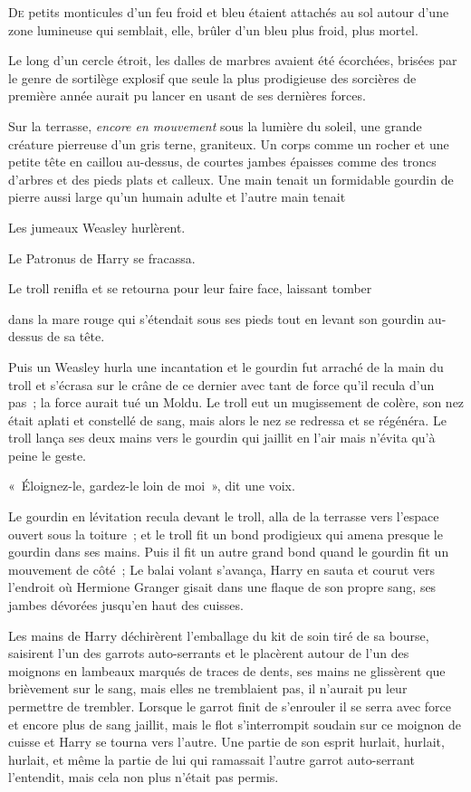
\lettrine{D}{e} petits monticules d'un feu froid et bleu étaient attachés au sol autour d'une zone lumineuse qui semblait, elle, brûler d'un bleu plus froid, plus mortel.

Le long d'un cercle étroit, les dalles de marbres avaient été écorchées, brisées par le genre de sortilège explosif que seule la plus prodigieuse des sorcières de première année aurait pu lancer en usant de ses dernières forces.

Sur la terrasse, \emph{encore en mouvement} sous la lumière du soleil, une grande créature pierreuse d'un gris terne, graniteux. Un corps comme un rocher et une petite tête en caillou au-dessus, de courtes jambes épaisses comme des troncs d'arbres et des pieds plats et calleux. Une main tenait un formidable gourdin de pierre aussi large qu'un humain adulte et l'autre main tenait

Les jumeaux Weasley hurlèrent.

Le Patronus de Harry se fracassa.

Le troll renifla et se retourna pour leur faire face, laissant tomber

dans la mare rouge qui s'étendait sous ses pieds tout en levant son gourdin au-dessus de sa tête.

Puis un Weasley hurla une incantation et le gourdin fut arraché de la main du troll et s'écrasa sur le crâne de ce dernier avec tant de force qu'il recula d'un pas~; la force aurait tué un Moldu. Le troll eut un mugissement de colère, son nez était aplati et constellé de sang, mais alors le nez se redressa et se régénéra. Le troll lança ses deux mains vers le gourdin qui jaillit en l'air mais n'évita qu'à peine le geste.

«~Éloignez-le, gardez-le loin de moi~», dit une voix.

Le gourdin en lévitation recula devant le troll, alla de la terrasse vers l'espace ouvert sous la toiture~; et le troll fit un bond prodigieux qui amena presque le gourdin dans ses mains. Puis il fit un autre grand bond quand le gourdin fit un mouvement de côté~; Le balai volant s'avança, Harry en sauta et courut vers l'endroit où Hermione Granger gisait dans une flaque de son propre sang, ses jambes dévorées jusqu'en haut des cuisses.

Les mains de Harry déchirèrent l'emballage du kit de soin tiré de sa bourse, saisirent l'un des garrots auto-serrants et le placèrent autour de l'un des moignons en lambeaux marqués de traces de dents, ses mains ne glissèrent que brièvement sur le sang, mais elles ne tremblaient pas, il n'aurait pu leur permettre de trembler. Lorsque le garrot finit de s'enrouler il se serra avec force et encore plus de sang jaillit, mais le flot s'interrompit soudain sur ce moignon de cuisse et Harry se tourna vers l'autre. Une partie de son esprit hurlait, hurlait, hurlait, et même la partie de lui qui ramassait l'autre garrot auto-serrant l'entendit, mais cela non plus n'était pas permis.

